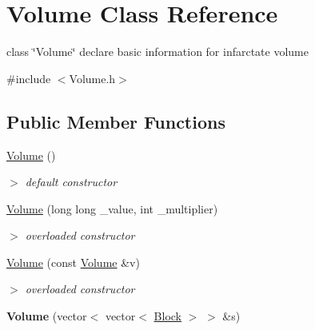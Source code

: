 \hypertarget{classVolume}{\section{\-Volume \-Class \-Reference}
\label{classVolume}
}


class \char`\"{}\-Volume\char`\"{} declare basic information for infarctate volume  




{\ttfamily \#include $<$\-Volume.\-h$>$}

\subsection*{\-Public \-Member \-Functions}
\begin{DoxyCompactItemize}
\item 
\hypertarget{classVolume_a7d3bb81da95df85009b9f3ddd985cd9f}{\hyperlink{classVolume_a7d3bb81da95df85009b9f3ddd985cd9f}{\-Volume} ()}\label{classVolume_a7d3bb81da95df85009b9f3ddd985cd9f}

\begin{DoxyCompactList}\small\item\em $>$ default constructor \end{DoxyCompactList}\item 
\hypertarget{classVolume_af048d0fefdd99ea5da2884cc05184f1c}{\hyperlink{classVolume_af048d0fefdd99ea5da2884cc05184f1c}{\-Volume} (long long \-\_\-value, int \-\_\-multiplier)}\label{classVolume_af048d0fefdd99ea5da2884cc05184f1c}

\begin{DoxyCompactList}\small\item\em $>$ overloaded constructor \end{DoxyCompactList}\item 
\hypertarget{classVolume_a050797870896c974456aace591085fcb}{\hyperlink{classVolume_a050797870896c974456aace591085fcb}{\-Volume} (const \hyperlink{classVolume}{\-Volume} \&v)}\label{classVolume_a050797870896c974456aace591085fcb}

\begin{DoxyCompactList}\small\item\em $>$ overloaded constructor \end{DoxyCompactList}\item 
\hypertarget{classVolume_a4252526a9e620590d6b08a4e88bb1226}{{\bfseries \-Volume} (vector$<$ vector$<$ \hyperlink{classBlock}{\-Block} $>$ $>$ \&s)}\label{classVolume_a4252526a9e620590d6b08a4e88bb1226}


\end{DoxyCompactItemize}

